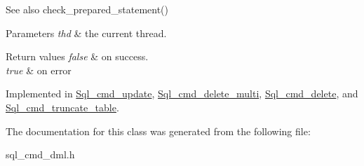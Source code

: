 \begin{DoxySeeAlso}{See also}
check\+\_\+prepared\+\_\+statement()
\end{DoxySeeAlso}

\begin{DoxyParams}{Parameters}
{\em thd} & the current thread.\\
\hline
\end{DoxyParams}

\begin{DoxyRetVals}{Return values}
{\em false} & on success. \\
\hline
{\em true} & on error \\
\hline
\end{DoxyRetVals}


Implemented in \mbox{\hyperlink{classSql__cmd__update_ae0fcfae54301cb796e4bc9adfc2c8ec5}{Sql\+\_\+cmd\+\_\+update}}, \mbox{\hyperlink{classSql__cmd__delete__multi_a335d296d9f32ec386cfaec2073209d60}{Sql\+\_\+cmd\+\_\+delete\+\_\+multi}}, \mbox{\hyperlink{classSql__cmd__delete_a9605fcb766fdc88c97d30ad9e02addd1}{Sql\+\_\+cmd\+\_\+delete}}, and \mbox{\hyperlink{classSql__cmd__truncate__table_acad0a1ad1b5137184b19d333abc3b1ba}{Sql\+\_\+cmd\+\_\+truncate\+\_\+table}}.



The documentation for this class was generated from the following file\+:\begin{DoxyCompactItemize}
\item 
sql\+\_\+cmd\+\_\+dml.\+h\end{DoxyCompactItemize}
